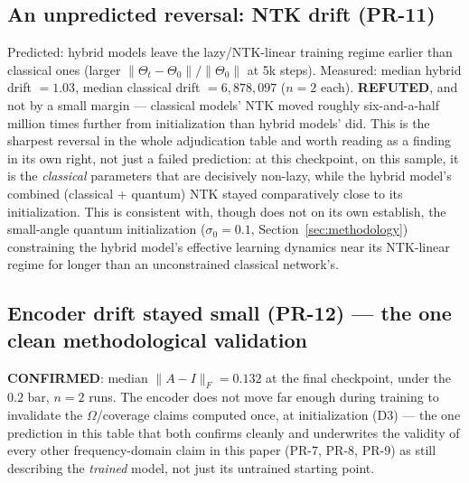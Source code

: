 \subsection{An unpredicted reversal: NTK drift (PR-11)}
Predicted: hybrid models leave the lazy/NTK-linear training regime earlier than
classical ones (larger $\|\Theta_t-\Theta_0\|/\|\Theta_0\|$ at 5k steps). Measured:
median hybrid drift $=1.03$, median classical drift $=6{,}878{,}097$ ($n=2$ each).
\textbf{REFUTED}, and not by a small margin --- classical models' NTK moved roughly
six-and-a-half million times further from initialization than hybrid models' did.
This is the sharpest reversal in the whole adjudication table and worth reading as a
finding in its own right, not just a failed prediction: at this checkpoint, on this
sample, it is the \emph{classical} parameters that are decisively non-lazy, while the
hybrid model's combined (classical + quantum) NTK stayed comparatively close to its
initialization. This is consistent with, though does not on its own establish, the
small-angle quantum initialization ($\sigma_0=0.1$, Section~\ref{sec:methodology})
constraining the hybrid model's effective learning dynamics near its NTK-linear regime
for longer than an unconstrained classical network's.

\subsection{Encoder drift stayed small (PR-12) --- the one clean methodological validation}
\textbf{CONFIRMED}: median $\|A-I\|_F=0.132$ at the final checkpoint, under the $0.2$
bar, $n=2$ runs. The encoder does not move far enough during training to invalidate the
$\Omega$/coverage claims computed once, at initialization (D3) --- the one prediction in
this table that both confirms cleanly and underwrites the validity of every other
frequency-domain claim in this paper (PR-7, PR-8, PR-9) as still describing the
\emph{trained} model, not just its untrained starting point.
